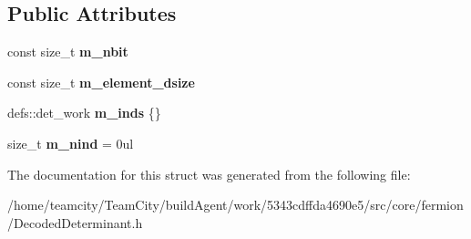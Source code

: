\subsection*{Public Attributes}
\begin{DoxyCompactItemize}
\item 
const size\+\_\+t {\bfseries m\+\_\+nbit}\hypertarget{structDecodedDeterminant_aa085943321206f6933ea1b39f63538b8}{}\label{structDecodedDeterminant_aa085943321206f6933ea1b39f63538b8}

\item 
const size\+\_\+t {\bfseries m\+\_\+element\+\_\+dsize}\hypertarget{structDecodedDeterminant_a28791ac6bd8b5af4e487bee525200036}{}\label{structDecodedDeterminant_a28791ac6bd8b5af4e487bee525200036}

\item 
defs\+::det\+\_\+work {\bfseries m\+\_\+inds} \{\}\hypertarget{structDecodedDeterminant_a54abd377e297c333dd4bdd6675badee5}{}\label{structDecodedDeterminant_a54abd377e297c333dd4bdd6675badee5}

\item 
size\+\_\+t {\bfseries m\+\_\+nind} = 0ul\hypertarget{structDecodedDeterminant_a002d04b059a903938f644dea5c7d8648}{}\label{structDecodedDeterminant_a002d04b059a903938f644dea5c7d8648}

\end{DoxyCompactItemize}


The documentation for this struct was generated from the following file\+:\begin{DoxyCompactItemize}
\item 
/home/teamcity/\+Team\+City/build\+Agent/work/5343cdffda4690e5/src/core/fermion/Decoded\+Determinant.\+h\end{DoxyCompactItemize}
